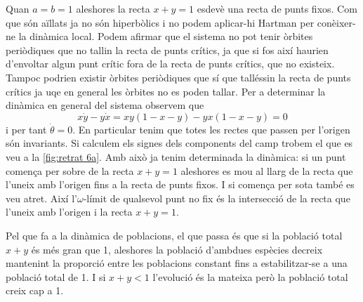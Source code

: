 \documentclass[12pt]{article}
\numberwithin{table}{section}
\numberwithin{equation}{section}
\numberwithin{figure}{section}
\begin{document}
Quan \( a = b = 1 \) aleshores la recta \( x + y = 1 \) esdevè una recta de punts fixos. Com que són aïllats ja no són hiperbòlics i no podem aplicar-hi Hartman per conèixer-ne la dinàmica local. Podem afirmar que el sistema no pot tenir òrbites periòdiques que no tallin la recta de punts crítics, ja que si fos així haurien d'envoltar algun punt crític fora de la recta de punts crítics, que no existeix. Tampoc podrien existir òrbites periòdiques que sí que talléssin la recta de punts crítics ja uqe en general les òrbites no es poden tallar. Per a determinar la dinàmica en general del sistema observem que 
\begin{equation*}
	x\dot{y} - y\dot{x} = xy(1 - x - y) - yx(1 - x - y) = 0
\end{equation*}
i per tant \( \dot{\theta} = 0 \). En particular tenim que totes les rectes que passen per l'origen són invariants. Si calculem els signes dels components del camp trobem el que es veu a la \cref{fig:retrat 6a}. Amb això ja tenim determinada la dinàmica: si un punt comença per sobre de la recta \( x + y = 1 \) aleshores es mou al llarg de la recta que l'uneix amb l'origen fins a la recta de punts fixos. I si comença per sota també es veu atret. Així l'\( \omega \)-límit de qualsevol punt no fix és la intersecció de la recta que l'uneix amb l'origen i la recta \( x+y = 1 \).  

Pel que fa a la dinàmica de poblacions, el que passa és que si la població total \( x + y \) és més gran que 1, aleshores la població d'ambdues espècies decreix mantenint la proporció entre les poblacions constant fins a estabilitzar-se a una població total de 1. I si \( x+y < 1 \) l'evolució és la mateixa però la població total creix cap a 1. 

\addtocounter{section}{2}
\addtocounter{section}{-1}
\setcounter{equation}{0}
\end{document}
